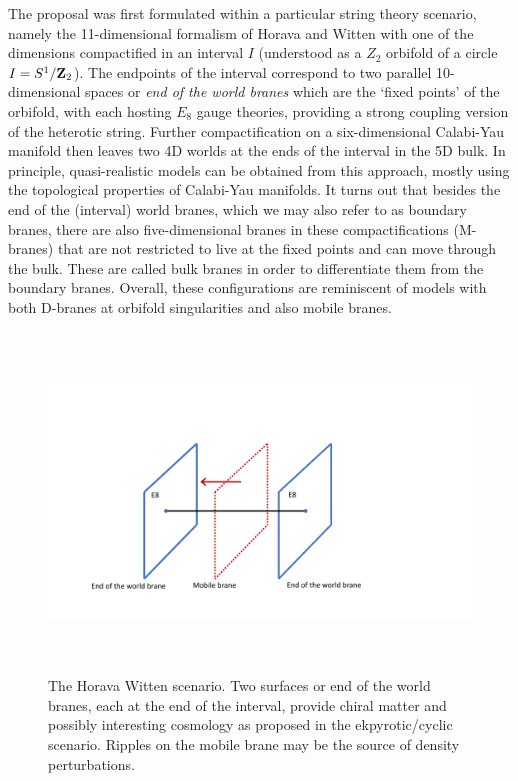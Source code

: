 The proposal was first formulated within a particular string theory scenario, namely the 11-dimensional formalism of Horava and Witten with one of the dimensions compactified in an interval $I$ (understood as a $Z_2$ orbifold of a circle $I=S^1/{\bf Z}_2$). 
The endpoints of the interval correspond to two parallel 10-dimensional spaces or {\it end of the world branes}  
which are the `fixed points' of the orbifold, with each hosting $E_8$ gauge theories, providing a strong coupling version of the heterotic string.
 Further compactification on a six-dimensional Calabi-Yau manifold then leaves two 
4D worlds at the ends of the interval in the 5D bulk. In principle, quasi-realistic
 models can be obtained from this approach, mostly using the topological
 properties of Calabi-Yau manifolds. It turns out that besides the end
 of the (interval) 
world branes, which we may also refer to as boundary  branes,
 there are also five-dimensional branes in these compactifications (M-branes) that are not restricted to
live at the fixed points and can move through the bulk.
 These are called bulk branes in order to differentiate them from the boundary branes. Overall, these
 configurations are reminiscent of models with both D-branes at orbifold singularities and also mobile branes.

\begin{figure}[t]
\begin{center}
\includegraphics[width=150mm,height=90mm]{Sections/Figures/Horava.pdf} 
\caption{The Horava Witten scenario. 
Two surfaces or end of the world branes, each at the end of 
the interval, provide chiral matter and possibly interesting cosmology as proposed in the ekpyrotic/cyclic scenario. Ripples on the mobile brane may be the source of density perturbations.} \label{Fig:HW} 
\end{center}
\end{figure}

